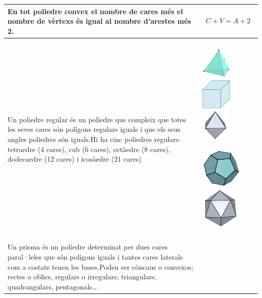 \begin{center}
\begin{longtable}{|p{}|p{}|}
 En tot poliedre convex el nombre de cares més el nombre de vèrtexs és igual al nombre d'arestes més 2. & \[C + V = A + 2\] \\ \hline
 
   \rowcolor{lightgray}\multicolumn{2}{|p{\textwidth}|}{\textbf{Poliedres regulars}} \\ \hline 
  
 Un poliedre regular és un poliedre que compleix que totes les seves cares són polígons regulars iguals i que els seus angles poliedres són iguals.\newline  Hi ha cinc poliedres regulars: tetraedre (4 cares), cub (6 cares), octàedre (8 cares), dodecaedre (12 cares) i  icosàedre (21 cares) & 
 \begin{center}
 	\includegraphics[height=1.5cm]{img-11/tetraedro}
 	\includegraphics[height=1.5cm]{img-11/poliedro-convexo}
 	\includegraphics[height=1.5cm]{img-11/octaedre}
 	
 	\includegraphics[height=2cm]{img-11/dodecaedre}
 	\includegraphics[height=2cm]{img-11/icosaedre}
 \end{center}
 
  \\ \hline 
 
   \rowcolor{lightgray}\multicolumn{2}{|p{\textwidth}|}{\textbf{Prismes}} \\ \hline 
  
   Un prisma és un poliedre determinat per dues cares paral·leles que són polígons iguals i tantes cares laterals com a costats tenen les bases.\newline Poden ser còncaus o convexos; rectes o oblics, regulars o irregulars; triangulars, quadrangulars, pentagonals{\dots}\  &
   

\end{longtable}
\end{center}
